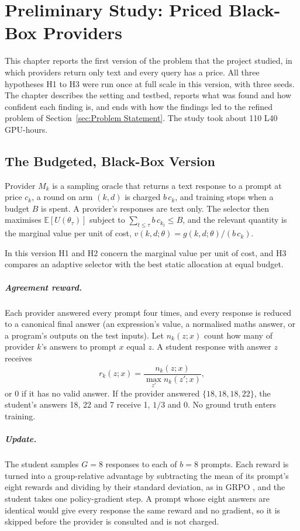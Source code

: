 \chapter{Preliminary Study: Priced Black-Box Providers}
\label{chap:Evaluation}

This chapter reports the first version of the problem that the project studied, in which
providers return only text and every query has a price. All three hypotheses H1 to H3
were run once at full scale in this version, with three seeds. The chapter describes the
setting and testbed, reports what was found and how confident each finding is, and ends
with how the findings led to the refined problem of
Section~\ref{sec:Problem Statement}. The study took about 110 L40 GPU-hours.

\section{The Budgeted, Black-Box Version}
\label{pre:sec:setup}

Provider $M_k$ is a sampling oracle that returns a text response to
a prompt at price $c_k$, a round on arm $(k, d)$ is charged $b\,c_k$, and training stops
when a budget $B$ is spent. A provider's responses are text only. The selector then maximises $\mathbb{E}[U(\theta_\tau)]$
subject to $\sum_{t \le \tau} b\,c_{k_t} \le B$, and the relevant quantity is the marginal
value per unit of cost, $v(k, d; \theta) = g(k, d; \theta) / (b\,c_k)$.

In this version H1 and H2 concern the marginal value per unit of cost, and H3 compares
an adaptive selector with the best static allocation at equal budget.

\paragraph{Agreement reward.} Each provider answered every prompt four times, and every
response is reduced to a canonical final answer (an expression's value, a normalised maths
answer, or a program's outputs on the test inputs). Let $n_k(z; x)$ count how many of
provider $k$'s answers to prompt $x$ equal $z$. A student response with answer $z$ receives
\[
  r_k(z; x) = \frac{n_k(z; x)}{\max_{z'} n_k(z'; x)},
\]
or 0 if it has no valid answer. If the provider answered $\{18, 18, 18, 22\}$, the student's
answers 18, 22 and 7 receive 1, $1/3$ and 0. No ground truth enters training.

\paragraph{Update.} The student samples $G = 8$ responses to each of $b = 8$ prompts. Each
reward is turned into a group-relative advantage by subtracting the mean of its prompt's
eight rewards and dividing by their standard deviation, as in GRPO
\autocite{shao_deepseekmath_grpo_2024}, and the student takes one policy-gradient step.
A prompt whose eight answers are identical would give every response the same reward and
no gradient, so it is skipped before the provider is consulted and is not charged.

